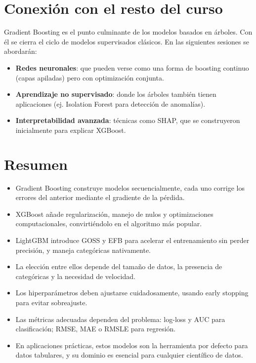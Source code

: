 \documentclass[12pt,a4paper,openany,oneside]{book}
\begin{document}
\section{Conexión con el resto del curso}
Gradient Boosting es el punto culminante de los modelos basados en árboles. Con él se cierra el ciclo de modelos supervisados clásicos. En las siguientes sesiones se abordarán:
\begin{itemize}
    \item \textbf{Redes neuronales}: que pueden verse como una forma de boosting continuo (capas apiladas) pero con optimización conjunta.
    \item \textbf{Aprendizaje no supervisado}: donde los árboles también tienen aplicaciones (ej. Isolation Forest para detección de anomalías).
    \item \textbf{Interpretabilidad avanzada}: técnicas como SHAP, que se construyeron inicialmente para explicar XGBoost.
\end{itemize}

\section{Resumen}
\begin{itemize}
    \item Gradient Boosting construye modelos secuencialmente, cada uno corrige los errores del anterior mediante el gradiente de la pérdida.
    \item XGBoost añade regularización, manejo de nulos y optimizaciones computacionales, convirtiéndolo en el algoritmo más popular.
    \item LightGBM introduce GOSS y EFB para acelerar el entrenamiento sin perder precisión, y maneja categóricas nativamente.
    \item La elección entre ellos depende del tamaño de datos, la presencia de categóricas y la necesidad de velocidad.
    \item Los hiperparámetros deben ajustarse cuidadosamente, usando early stopping para evitar sobreajuste.
    \item Las métricas adecuadas dependen del problema: log-loss y AUC para clasificación; RMSE, MAE o RMSLE para regresión.
    \item En aplicaciones prácticas, estos modelos son la herramienta por defecto para datos tabulares, y su dominio es esencial para cualquier científico de datos.
\end{itemize}
\end{document}
